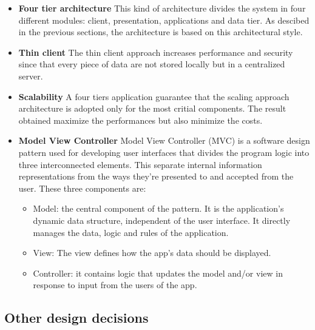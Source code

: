 \documentclass[table, 12pt]{article}
\begin{document}
    \begin{itemize}
        \item \textbf{Four tier architecture} \newline
              This kind of architecture divides the system in four different modules: client, presentation, applications and data tier.
              As descibed in the previous sections, the architecture is based on this architectural style.
        \item \textbf{Thin client} \newline
              The thin client approach increases performance and security since that every piece of data are not stored locally but in a centralized server.
        \item \textbf{Scalability} \newline
              A four tiers application guarantee that the scaling approach architecture is adopted only for the most critial components.
              The result obtained maximize the performances but also minimize the costs.
        \item \textbf{Model View Controller} \newline
              Model View Controller \cite{mvc} (MVC) is a software design pattern used for developing user interfaces that divides the program logic into three interconnected elements.
              This separate internal information representations from the ways they're presented to and accepted from the user.
              These three components are:
              \begin{itemize}
                  \item Model: the central component of the pattern. It is the application's dynamic data structure, independent of the user interface. It directly manages the data, logic and rules of the application.
                  \item View: The view defines how the app's data should be displayed.
                  \item Controller: it contains logic that updates the model and/or view in response to input from the users of the app. 
              \end{itemize}
    \end{itemize}

\newpage

\subsection{Other design decisions}
\label{other_design_decisions}
\end{document}
